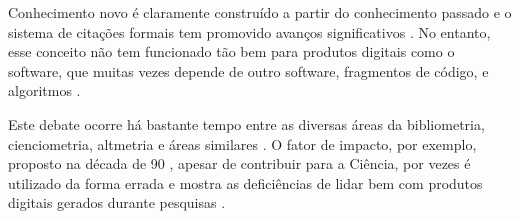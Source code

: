 Conhecimento novo é claramente construído a partir do conhecimento passado e o
sistema de citações formais tem promovido avanços significativos
\cite{katz2014transitive}.
No entanto, esse conceito não tem funcionado tão bem para produtos digitais
como o software, que muitas vezes depende de outro software, fragmentos de
código, e algoritmos \cite{katz2014transitive}.

Este debate ocorre há bastante tempo entre as diversas áreas da bibliometria,
cienciometria, altmetria e áreas similares \cite{gouveia2013altmetria}.
O fator de impacto, por exemplo, proposto na década de 90
\cite{reuters2017history}, apesar de contribuir para a Ciência, por
vezes é utilizado da forma errada e mostra as deficiências de lidar bem com
produtos digitais gerados durante pesquisas \cite{katz2014transitive}.




%



